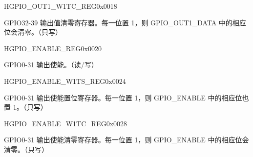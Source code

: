 \begin{register}{H}{GPIO\_OUT1\_W1TC\_REG}{0x0018}\label{regdesc:GPIOOUT1W1TCREG}
%
%
\regnewline%
\begin{regdesc}\begin{reglist}
\item [GPIO\_OUT\_DATA]GPIO32-39 输出值清零寄存器。每一位置 1，则 GPIO\_OUT1\_DATA 中的相应位会清零。（只写） 
\end{reglist}\end{regdesc}
\end{register}


\begin{register}{H}{GPIO\_ENABLE\_REG}{0x0020}\label{regdesc:GPIOENABLEREG}
%
\regnewline%
\begin{regdesc}\begin{reglist}
\item [GPIO\_ENABLE\_REG]GPIO0-31 输出使能。（读/写）
\end{reglist}\end{regdesc}
\end{register}


\begin{register}{H}{GPIO\_ENABLE\_W1TS\_REG}{0x0024}\label{regdesc:GPIOENABLEW1TSREG}
%
\regnewline%
\begin{regdesc}\begin{reglist}
\item [GPIO\_ENABLE\_W1TS\_REG]GPIO0-31 输出使能置位寄存器。每一位置 1，则 GPIO\_ENABLE 中的相应位也置 1。（只写）
\end{reglist}\end{regdesc}
\end{register}


\begin{register}{H}{GPIO\_ENABLE\_W1TC\_REG}{0x0028}\label{regdesc:GPIOENABLEW1TCREG}
%
\regnewline%
\begin{regdesc}\begin{reglist}
\item [GPIO\_ENABLE\_W1TC\_REG]GPIO0-31 输出使能清零寄存器。每一位置 1，则 GPIO\_ENABLE 中的相应位会清零。（只写） 
\end{reglist}\end{regdesc}
\end{register}


